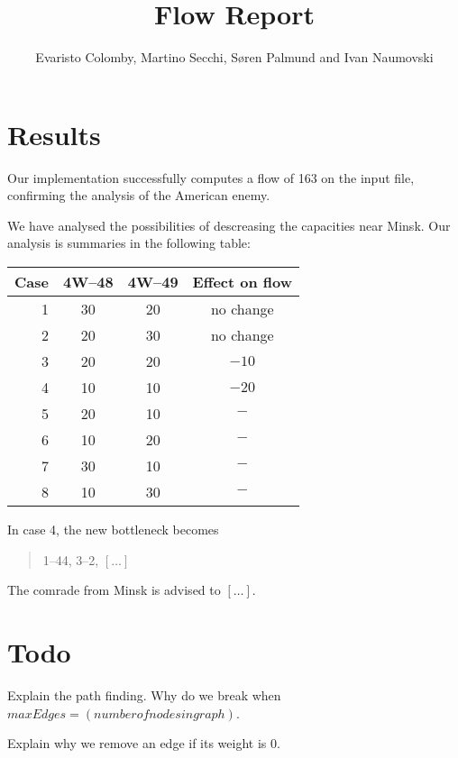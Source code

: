 \documentclass{tufte-handout}
\title{Flow Report}
\author{Evaristo Colomby, Martino Secchi, Søren Palmund and Ivan Naumovski}
\begin{document}
	\maketitle
  \section{Results}

  Our implementation successfully computes a flow of 163 on the input file, confirming the analysis of the American enemy.

  We have analysed the possibilities of descreasing the capacities near Minsk.
  Our analysis is summaries in the following table:

\bigskip
  \begin{tabular}{rccc}\toprule
    Case & 4W--48	& 4W--49	& Effect on flow	\\\midrule
    1		& 30			& 20			& no change 		\\
    2		& 20 			& 30 			& no change 		\\
    3		& 20			& 20			& $-10$ 			\\
    4		& 10			& 10			& $-20$				\\
    5		& 20			& 10			& $-$				\\
    6		& 10			& 20			& $-$				\\
    7		& 30			& 10			& $-$				\\
    8		& 10			& 30			& $-$				\\\bottomrule
  \end{tabular}
  \bigskip

  In case 4, the new bottleneck becomes
  \begin{quote}
      1--44, 3--2, $[\ldots]$
  \end{quote}
  The comrade from Minsk is advised to $[\ldots]$.
  
  \section{Todo}
  Explain the path finding. Why do we break when $maxEdges = (number of nodes in graph)$.
  
  Explain why we remove an edge if its weight is 0.
  
\end{document}
